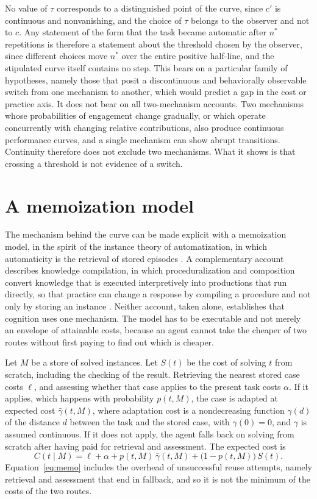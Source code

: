 \documentclass[11pt]{report}
\theoremstyle{remark}
\theoremstyle{definition}
\begin{document}
No value of $\tau$ corresponds to a distinguished point of the curve, since $c'$ is continuous and nonvanishing, and the choice of $\tau$ belongs to the observer and not to $c$. Any statement of the form that the task became automatic after $n^*$ repetitions is therefore a statement about the threshold chosen by the observer, since different choices move $n^*$ over the entire positive half-line, and the stipulated curve itself contains no step. This bears on a particular family of hypotheses, namely those that posit a discontinuous and behaviorally observable switch from one mechanism to another, which would predict a gap in the cost or practice axis. It does not bear on all two-mechanism accounts. Two mechanisms whose probabilities of engagement change gradually, or which operate concurrently with changing relative contributions, also produce continuous performance curves, and a single mechanism can show abrupt transitions. Continuity therefore does not exclude two mechanisms. What it shows is that crossing a threshold is not evidence of a switch.

\section{A memoization model}

The mechanism behind the curve can be made explicit with a memoization model, in the spirit of the instance theory of automatization, in which automaticity is the retrieval of stored episodes \cite{logan1988}. A complementary account describes knowledge compilation, in which proceduralization and composition convert knowledge that is executed interpretively into productions that run directly, so that practice can change a response by compiling a procedure and not only by storing an instance \cite{anderson1982}. Neither account, taken alone, establishes that cognition uses one mechanism. The model has to be executable and not merely an envelope of attainable costs, because an agent cannot take the cheaper of two routes without first paying to find out which is cheaper.

Let $M$ be a store of solved instances. Let $S(t)$ be the cost of solving $t$ from scratch, including the checking of the result. Retrieving the nearest stored case costs $\ell$, and assessing whether that case applies to the present task costs $\alpha$. If it applies, which happens with probability $p(t,M)$, the case is adapted at expected cost $\bar\gamma(t,M)$, where adaptation cost is a nondecreasing function $\gamma(d)$ of the distance $d$ between the task and the stored case, with $\gamma(0)=0$, and $\gamma$ is assumed continuous. If it does not apply, the agent falls back on solving from scratch after having paid for retrieval and assessment. The expected cost is
\begin{equation}
C(t\mid M)=\ell+\alpha+p(t,M)\,\bar\gamma(t,M)+\bigl(1-p(t,M)\bigr)\,S(t).\label{eq:memo}
\end{equation}
Equation~\eqref{eq:memo} includes the overhead of unsuccessful reuse attempts, namely retrieval and assessment that end in fallback, and so it is not the minimum of the costs of the two routes.
\end{document}
